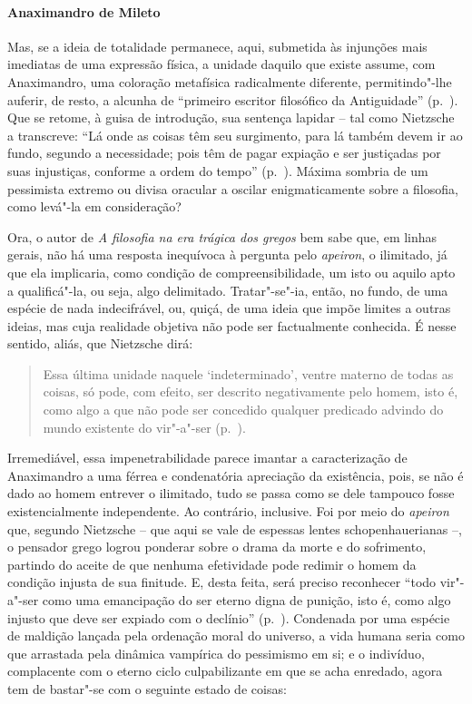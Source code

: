 \paragraph{Anaximandro de Mileto} Mas, se a ideia de totalidade permanece,
 aqui, submetida às injunções mais imediatas de uma expressão física, a
 unidade daquilo que existe assume, com Anaximandro, uma coloração metafísica
 radicalmente diferente, permitindo"-lhe auferir, de resto, a alcunha de
 ``primeiro escritor filosófico da Antiguidade'' (p.~\pageref{primeiroescritor}). 
 Que se retome, à guisa de introdução, sua sentença
 lapidar -- tal como Nietzsche a transcreve: ``Lá onde as coisas têm seu
 surgimento, para lá também devem ir ao fundo, segundo a necessidade; pois
 têm de pagar expiação e ser justiçadas por suas injustiças, conforme a ordem
 do tempo'' (p.~\pageref{laondeascoisas}). Máxima sombria de um pessimista
 extremo ou divisa oracular a oscilar enigmaticamente sobre a filosofia, como
 levá"-la em consideração? 

Ora, o autor de \textit{A filosofia na era trágica dos gregos} bem sabe que,
em linhas gerais, não há uma resposta inequívoca à pergunta pelo
\textit{apeiron}, o ilimitado, já que ela implicaria, como condição de
 compreensibilidade, um isto ou aquilo apto a qualificá"-la, ou seja, algo
 delimitado. Tratar"-se"-ia, então, no fundo, de uma espécie de nada
 indecifrável, ou, quiçá, de uma ideia que impõe limites a outras ideias, mas
 cuja realidade objetiva não pode ser factualmente conhecida. É nesse
 sentido, aliás, que Nietzsche dirá:

\begin{quote} 
Essa última unidade naquele `indeterminado', ventre materno
 de todas as coisas, só pode, com efeito, ser descrito negativamente pelo
 homem, isto é, como algo a que não pode ser concedido qualquer predicado
 advindo do mundo existente do vir"-a"-ser (p.~\pageref{essaultimaunidade}).
\end{quote} 

 Irremediável, essa impenetrabilidade parece imantar a caracterização de
 Anaximandro a uma férrea e condenatória apreciação da existência, pois, se
 não é dado ao homem entrever o ilimitado, tudo se passa como se dele
 tampouco fosse existencialmente independente. Ao contrário, inclusive. Foi
 por meio do \textit{apeiron} que, segundo Nietzsche -- que aqui se vale de
 espessas lentes schopenhauerianas --, o pensador grego logrou ponderar sobre
 o drama da morte e do sofrimento, partindo do aceite de que nenhuma
 efetividade pode redimir o homem da condição injusta de sua finitude. E,
 desta feita, será preciso reconhecer ``todo vir"-a"-ser como uma emancipação
 do ser eterno digna de punição, isto é, como algo injusto que deve ser
 expiado com o declínio'' (p.~\pageref{sereterno}). Condenada por uma espécie
 de maldição lançada pela ordenação moral do universo, a vida humana seria
 como que arrastada pela dinâmica vampírica do pessimismo em si; e o
 indivíduo, complacente com o eterno ciclo culpabilizante em que se acha
 enredado, agora tem de bastar"-se com o seguinte estado de coisas: 

